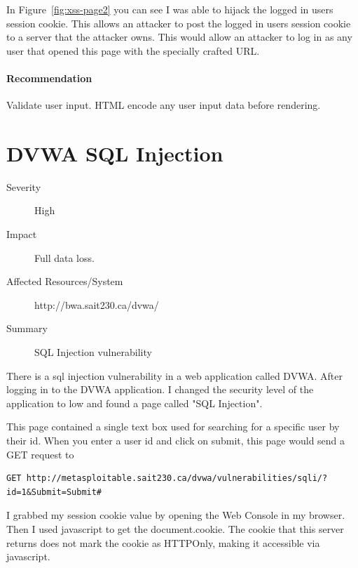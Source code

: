 \documentclass{article}
\begin{document}
In Figure~\ref{fig:xss-page2} you can see I was able to hijack the logged
in users session cookie. This allows an attacker to post the logged in
users session cookie to a server that the attacker owns. This would allow
an attacker to log in as any user that opened this page with the specially
crafted URL.

\paragraph{Recommendation}

Validate user input. HTML encode any user input data before rendering.

\newpage
\section{DVWA SQL Injection}

\begin{description}
  \item[Severity] High
  \item[Impact] Full data loss.
  \item[Affected Resources/System] http://bwa.sait230.ca/dvwa/
  \item[Summary] SQL Injection vulnerability
\end{description}

There is a sql injection vulnerability in a web application called DVWA\@.
After logging in to the DVWA application. I changed the security level of the application to low
and found a page called "SQL Injection".

This page contained a single text box used for searching for a specific user by their id.
When you enter a user id and click on submit, this page would send a GET request to 

\begin{lstlisting}
GET http://metasploitable.sait230.ca/dvwa/vulnerabilities/sqli/?id=1&Submit=Submit#
\end{lstlisting}

I grabbed my session cookie value by opening the Web Console in my browser.
Then I used javascript to get the document.cookie. The cookie that this server
returns does not mark the cookie as HTTPOnly, making it accessible via javascript.
\end{document}

